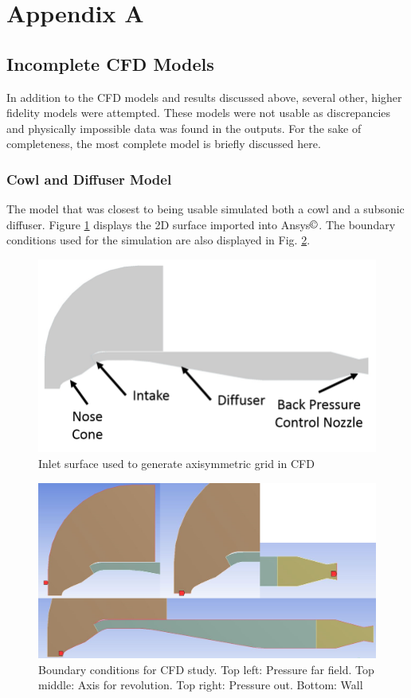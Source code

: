 \section{Appendix A}
\subsection{Incomplete CFD Models}
In addition to the CFD models and results discussed above, several other, higher fidelity models were attempted. These models were not usable as discrepancies and physically impossible data was found in the outputs. For the sake of completeness, the most complete model is briefly discussed here.

\subsubsection{Cowl and Diffuser Model}
The model that was closest to being usable simulated both a cowl and a subsonic diffuser. Figure \ref{fig:InletSurf} displays the 2D surface imported into Ansys$\copyright$. The boundary conditions used for the simulation are also displayed in Fig. \ref{fig:InletBCs}.

\begin{figure}[H]
\centering
\includegraphics[width=.7\textwidth]{JWE_Figures/CFD_Surface.png}
\caption{Inlet surface used to generate axisymmetric grid in CFD}
\label{fig:InletSurf}
\end{figure}

\begin{figure}[H]
\centering
\includegraphics[width=1.0\textwidth]{JWE_Figures/BC_Group.png}
\caption{Boundary conditions for CFD study. Top left: Pressure far field. Top middle: Axis for revolution. Top right: Pressure out. Bottom: Wall}
\label{fig:InletBCs}
\end{figure}

